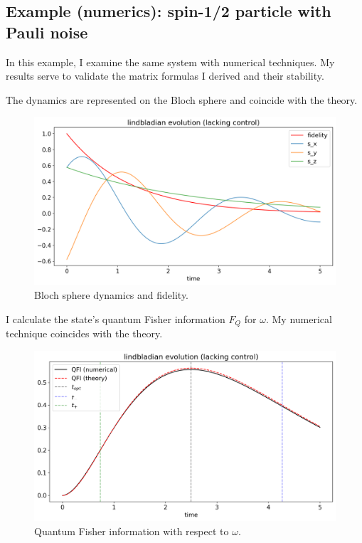 \documentclass[12pt]{article}
\begin{document}
\subsection{Example (numerics): spin-1/2 particle with Pauli noise}

In this example, I examine the same system with numerical techniques. My results serve to validate the matrix formulas I derived and their stability.

The dynamics are represented on the Bloch sphere and coincide with the theory.
\begin{figure}[ht]
    \centering
    \includegraphics[width=12cm]{bloch_no_control.png}
    \caption{Bloch sphere dynamics and fidelity.}
    \label{fig: bloch_no_control}
    \centering
\end{figure}

I calculate the state's quantum Fisher information $F_Q$ for $\omega$. My numerical technique coincides with the theory.
\begin{figure}[ht]
    \centering
    \includegraphics[width=12cm]{info_no_control.png}
    \caption{Quantum Fisher information with respect to $\omega$.}
    \label{fig: info_no_control}
    \centering
\end{figure}
\end{document}
